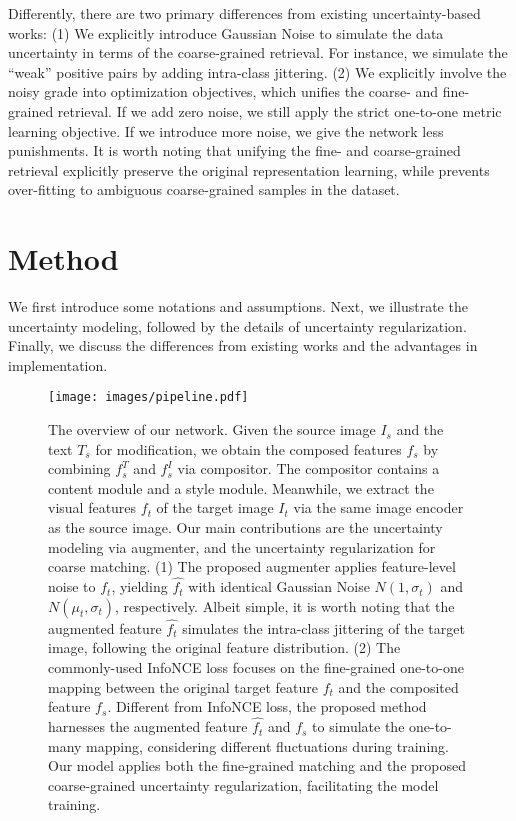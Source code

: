 \documentclass[10pt,twocolumn,letterpaper]{article}
\begin{document}
Differently, there are two primary differences from existing uncertainty-based works: (1) We explicitly introduce Gaussian Noise to simulate the data uncertainty in terms of the coarse-grained retrieval. For instance, we simulate the ``weak'' positive pairs by adding intra-class jittering.  
(2) We explicitly involve the noisy grade into optimization objectives, which unifies the coarse- and fine-grained retrieval. If we add zero noise, we still apply the strict one-to-one metric learning objective. If we introduce more noise, we give the network less punishments. It is worth noting that unifying the fine- and coarse-grained retrieval explicitly preserve the original representation learning, while prevents over-fitting to ambiguous coarse-grained samples in the dataset.
 

\section{Method} \label{sec:method}
We first introduce some notations and assumptions. Next, we illustrate the uncertainty modeling, followed by the details of uncertainty regularization. Finally, we discuss the differences from existing works and the advantages in implementation. 

\begin{figure*}[t]
\begin{center}\vspace{-.1in}
     \texttt{[image: images/pipeline.pdf]}
     \vspace{-.15in}
     \caption{The overview of our network.  
     Given the source image $I_s$ and the text $T_s$ for modification, we obtain the composed features $f_s$ by combining $f^T_s$ and $f^I_s$ via compositor. The compositor contains a content module and a style module.
     Meanwhile, we extract the visual features $f_t$ of the target image $I_t$ via the same image encoder as the source image.  
     Our main contributions are the uncertainty modeling via augmenter, and the uncertainty regularization for coarse matching. 
     (1) The proposed augmenter applies feature-level noise to $f_t$, yielding $\hat{f_t}$ with identical Gaussian Noise $N(1,\sigma_t)$ and $N(\mu_t,\sigma_t)$, respectively. Albeit simple, it is worth noting that the augmented feature $\hat{f_t}$ simulates the intra-class jittering of the target image, following the original feature distribution. 
     (2) The commonly-used InfoNCE loss focuses on the fine-grained one-to-one mapping between the original target feature $f_t$ and the composited feature $f_s$.
     Different from InfoNCE loss, the proposed method harnesses the augmented feature $\hat{f_t}$ and $f_s$ to simulate the one-to-many mapping, considering different fluctuations during training. 
     Our model applies both the fine-grained matching and the proposed coarse-grained uncertainty regularization, facilitating the model training. 
     }
     \label{fig:pipeline} \vspace{-.2in}
\end{center} 
\end{figure*}
\end{document}
